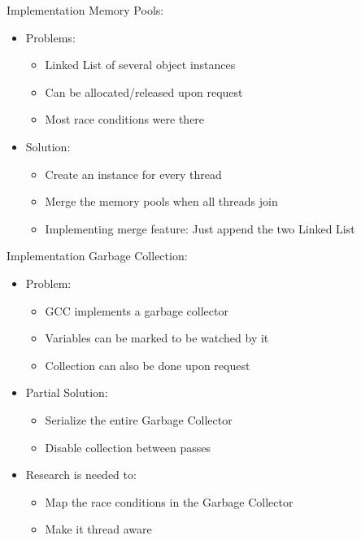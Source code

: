 \begin{frame}{Implementation}
    Memory Pools:
    \begin{itemize}
        \item Problems:
            \begin{itemize}
                \item Linked List of several object instances
                \item Can be allocated/released upon request
                \item Most race conditions were there
            \end{itemize}
        \item Solution:
            \begin{itemize}
                \item Create an instance for every thread
                \item Merge the memory pools when all threads join
                \item Implementing merge feature: Just append the two Linked List
            \end{itemize}
    \end{itemize}
\end{frame}

\begin{frame}{Implementation}
    Garbage Collection: 
    \begin{itemize}
        \item Problem: 
            \begin{itemize}
                \item GCC implements a garbage collector 
                \item Variables can be marked to be watched by it
                \item Collection can also be done upon request
            \end{itemize}
        \item Partial Solution:
            \begin{itemize}
                \item Serialize the entire Garbage Collector
                \item Disable collection between passes
            \end{itemize}
        \item Research is needed to:
            \begin{itemize}
                \item Map the race conditions in the Garbage Collector 
                \item Make it thread aware
            \end{itemize}
    \end{itemize}
\end{frame}

